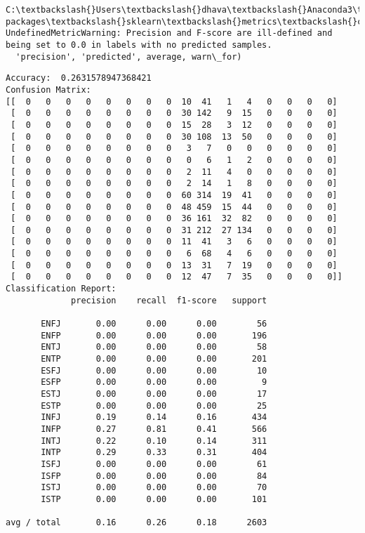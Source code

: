 \documentclass[11pt]{article}
\begin{document}
    \begin{Verbatim}[commandchars=\\\{\}]
C:\textbackslash{}Users\textbackslash{}dhava\textbackslash{}Anaconda3\textbackslash{}lib\textbackslash{}site-packages\textbackslash{}sklearn\textbackslash{}metrics\textbackslash{}classification.py:1135: UndefinedMetricWarning: Precision and F-score are ill-defined and being set to 0.0 in labels with no predicted samples.
  'precision', 'predicted', average, warn\_for)

    \end{Verbatim}

    \begin{Verbatim}[commandchars=\\\{\}]
Accuracy:  0.2631578947368421
Confusion Matrix:
[[  0   0   0   0   0   0   0   0  10  41   1   4   0   0   0   0]
 [  0   0   0   0   0   0   0   0  30 142   9  15   0   0   0   0]
 [  0   0   0   0   0   0   0   0  15  28   3  12   0   0   0   0]
 [  0   0   0   0   0   0   0   0  30 108  13  50   0   0   0   0]
 [  0   0   0   0   0   0   0   0   3   7   0   0   0   0   0   0]
 [  0   0   0   0   0   0   0   0   0   6   1   2   0   0   0   0]
 [  0   0   0   0   0   0   0   0   2  11   4   0   0   0   0   0]
 [  0   0   0   0   0   0   0   0   2  14   1   8   0   0   0   0]
 [  0   0   0   0   0   0   0   0  60 314  19  41   0   0   0   0]
 [  0   0   0   0   0   0   0   0  48 459  15  44   0   0   0   0]
 [  0   0   0   0   0   0   0   0  36 161  32  82   0   0   0   0]
 [  0   0   0   0   0   0   0   0  31 212  27 134   0   0   0   0]
 [  0   0   0   0   0   0   0   0  11  41   3   6   0   0   0   0]
 [  0   0   0   0   0   0   0   0   6  68   4   6   0   0   0   0]
 [  0   0   0   0   0   0   0   0  13  31   7  19   0   0   0   0]
 [  0   0   0   0   0   0   0   0  12  47   7  35   0   0   0   0]]
Classification Report:
             precision    recall  f1-score   support

       ENFJ       0.00      0.00      0.00        56
       ENFP       0.00      0.00      0.00       196
       ENTJ       0.00      0.00      0.00        58
       ENTP       0.00      0.00      0.00       201
       ESFJ       0.00      0.00      0.00        10
       ESFP       0.00      0.00      0.00         9
       ESTJ       0.00      0.00      0.00        17
       ESTP       0.00      0.00      0.00        25
       INFJ       0.19      0.14      0.16       434
       INFP       0.27      0.81      0.41       566
       INTJ       0.22      0.10      0.14       311
       INTP       0.29      0.33      0.31       404
       ISFJ       0.00      0.00      0.00        61
       ISFP       0.00      0.00      0.00        84
       ISTJ       0.00      0.00      0.00        70
       ISTP       0.00      0.00      0.00       101

avg / total       0.16      0.26      0.18      2603


    \end{Verbatim}
\end{document}
